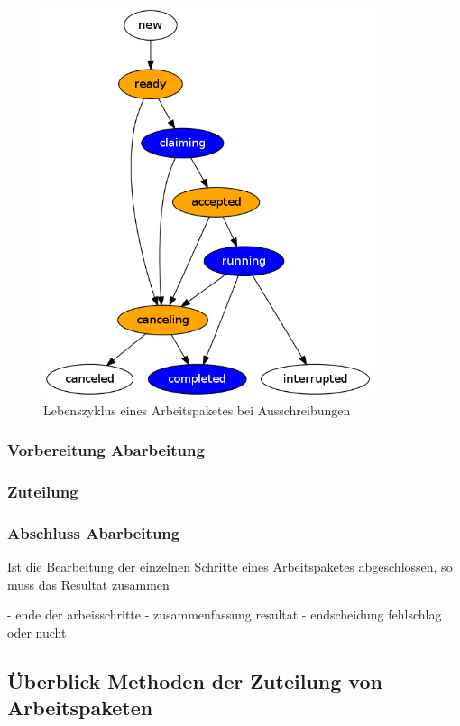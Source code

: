 \begin{figure}[ht] 
  \centering
  \label{fig:lebenszyklus-arbeitspaket}
  \includegraphics[height=4.5in]{imageinput/lebenszyklus-arbeitspaket.png}
  \caption{Lebenszyklus eines Arbeitspaketes bei Ausschreibungen}
\end{figure}


\subsubsection{Vorbereitung Abarbeitung}

\subsubsection{Zuteilung}


\subsubsection{Abschluss Abarbeitung}

Ist die Bearbeitung der einzelnen Schritte eines Arbeitspaketes abgeschlossen,
so muss das Resultat zusammen

- ende der arbeisschritte
- zusammenfassung resultat
- endscheidung fehlschlag oder nucht


\subsection{Überblick Methoden der Zuteilung von Arbeitspaketen}

